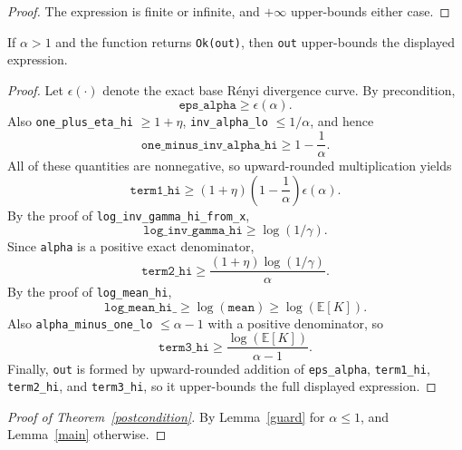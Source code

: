 \documentclass{article}
\begin{document}
\begin{proof}
The expression is finite or infinite, and $+\infty$ upper-bounds either case.
\end{proof}

\begin{lemma}
\label{main}
If $\alpha > 1$ and the function returns \texttt{Ok(out)}, then \texttt{out} upper-bounds the
displayed expression.
\end{lemma}

\begin{proof}
Let $\epsilon(\cdot)$ denote the exact base Rényi divergence curve. By precondition,
\[
\texttt{eps\_alpha} \ge \epsilon(\alpha).
\]
Also \texttt{one\_plus\_eta\_hi} $\ge 1 + \eta$, \texttt{inv\_alpha\_lo} $\le 1/\alpha$, and hence
\[
\texttt{one\_minus\_inv\_alpha\_hi} \ge 1 - \frac{1}{\alpha}.
\]
All of these quantities are nonnegative, so upward-rounded multiplication yields
\[
\texttt{term1\_hi} \ge (1+\eta)\!\left(1 - \frac{1}{\alpha}\right)\epsilon(\alpha).
\]
By the proof of \texttt{log\_inv\_gamma\_hi\_from\_x},
\[
\texttt{log\_inv\_gamma\_hi} \ge \log(1/\gamma).
\]
Since \texttt{alpha} is a positive exact denominator,
\[
\texttt{term2\_hi} \ge \frac{(1+\eta)\log(1/\gamma)}{\alpha}.
\]
By the proof of \texttt{log\_mean\_hi},
\[
\texttt{log\_mean\_hi\_} \ge \log(\texttt{mean}) \ge \log(\mathbb{E}[K]).
\]
Also \texttt{alpha\_minus\_one\_lo} $\le \alpha - 1$ with a positive denominator, so
\[
\texttt{term3\_hi} \ge \frac{\log(\mathbb{E}[K])}{\alpha - 1}.
\]
Finally, \texttt{out} is formed by upward-rounded addition of
\texttt{eps\_alpha}, \texttt{term1\_hi}, \texttt{term2\_hi}, and \texttt{term3\_hi}, so it
upper-bounds the full displayed expression.
\end{proof}

\begin{proof}[Proof of Theorem~\ref{postcondition}]
By Lemma~\ref{guard} for $\alpha \le 1$, and Lemma~\ref{main} otherwise.
\end{proof}
\end{document}

